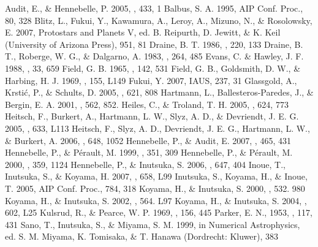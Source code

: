 \documentclass[12pt,preprint]{aastex}
\begin{document}
\begin{thebibliography}{}
 Audit, E., \& Hennebelle, P. 2005, \aap, 433, 1
 Balbus, S. A. 1995, AIP Conf. Proc., 80, 328
 Blitz, L., Fukui, Y., Kawamura, A., Leroy, A., Mizuno, N., \& Rosolowsky, E. 2007, Protostars and Planets V, ed. B. Reipurth, D. Jewitt, \& K. Keil (University of Arizona Press), 951, 81 
 Draine, B. T. 1986, \mnras, 220, 133
 Draine, B. T., Roberge, W. G., \& Dalgarno, A. 1983, \apj, 264, 485
 Evans, C. \& Hawley, J. F. 1988, \apj, 33, 659
 Field, G. B. 1965, \apj, 142, 531
 Field, G. B., Goldsmith, D. W., \& Harbing, H. J. 1969, \apj, 155, L149
 Fukui, Y. 2007, IAUS, 237, 31
 Glassgold, A., Krsti\'c, P., \& Schults, D. 2005, \apj, 621, 808
 Hartmann, L., Ballesteros-Paredes, J., \& Bergin, E. A. 2001, \apj, 562, 852.
 Heiles, C., \& Troland, T. H. 2005, \apj, 624, 773
 Heitsch, F., Burkert, A., Hartmann, L. W., Slyz, A. D., \& Devriendt, J. E. G. 2005, \apj, 633, L113
 Heitsch, F., Slyz, A. D., Devriendt, J. E. G., Hartmann, L. W., \& Burkert, A. 2006, \apj, 648, 1052
 Hennebelle, P., \& Audit, E. 2007, \aap, 465, 431
 Hennebelle, P., \& P\'erault, M. 1999, \apj, 351, 309
 Hennebelle, P., \& P\'erault, M. 2000, \apj, 359, 1124
 Hennebelle, P., \& Inutsuka, S. 2006, \apj, 647, 404
 Inoue, T., Inutsuka, S., \& Koyama, H. 2007, \apj, 658, L99
 Inutsuka, S., Koyama, H., \& Inoue, T. 2005, AIP Conf. Proc., 784, 318
 Koyama, H., \& Inutsuka, S. 2000, \apj, 532. 980
 Koyama, H., \& Inutsuka, S. 2002, \apj, 564. L97
 Koyama, H., \& Inutsuka, S. 2004, \apj, 602, L25
 Kulsrud, R., \& Pearce, W. P. 1969, \apj, 156, 445
 Parker, E. N., 1953, \apj, 117, 431
 Sano, T., Inutsuka, S., \& Miyama, S. M. 1999, in Numerical Astrophysics, ed. S. M. Miyama, K. Tomisaka, \& T. Hanawa (Dordrecht: Kluwer), 383

\end{thebibliography}
\end{document}
